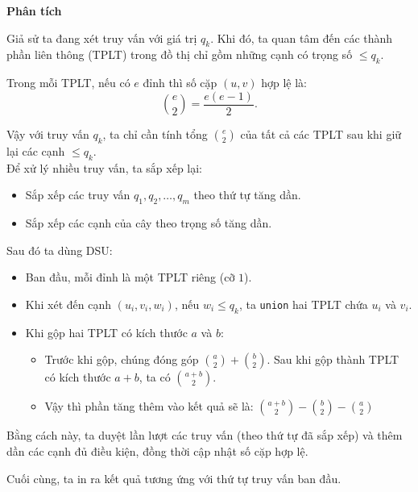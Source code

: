\documentclass{article}
\begin{document}
\textbf{Phân tích}


Giả sử ta đang xét truy vấn với giá trị $q_k$. Khi đó, ta quan tâm đến các thành phần liên thông (TPLT) trong đồ thị chỉ gồm những cạnh có trọng số $\leq q_k$.  

Trong mỗi TPLT, nếu có $e$ đỉnh thì số cặp $(u,v)$ hợp lệ là:
\[
\binom{e}{2} = \frac{e(e-1)}{2}.
\]

Vậy với truy vấn $q_k$, ta chỉ cần tính tổng $\binom{e}{2}$ của tất cả các TPLT sau khi giữ lại các cạnh $\leq q_k$.\\

Để xử lý nhiều truy vấn, ta sắp xếp lại:

\begin{itemize}
    \item Sắp xếp các truy vấn $q_1, q_2, \dots, q_m$ theo thứ tự tăng dần.
    \item Sắp xếp các cạnh của cây theo trọng số tăng dần.
\end{itemize}

Sau đó ta dùng DSU:

\begin{itemize}
    \item Ban đầu, mỗi đỉnh là một TPLT riêng (cỡ $1$).
    \item Khi xét đến cạnh $(u_i, v_i, w_i)$, nếu $w_i \leq q_k$, ta \texttt{union} hai TPLT chứa $u_i$ và $v_i$.
    \item Khi gộp hai TPLT có kích thước $a$ và $b$:
    \begin{itemize}
        \item Trước khi gộp, chúng đóng góp $\binom{a}{2} + \binom{b}{2}$. Sau khi gộp thành TPLT có kích thước $a + b$, ta có $\binom{a + b}{2}$.
        \item Vậy thì phần tăng thêm vào kết quả sẽ là: $\binom{a + b}{2} - \binom{b}{2} - \binom{a}{2}$
    \end{itemize}
\end{itemize}

Bằng cách này, ta duyệt lần lượt các truy vấn (theo thứ tự đã sắp xếp) và thêm dần các cạnh đủ điều kiện, đồng thời cập nhật số cặp hợp lệ.  

Cuối cùng, ta in ra kết quả tương ứng với thứ tự truy vấn ban đầu.
\end{document}
